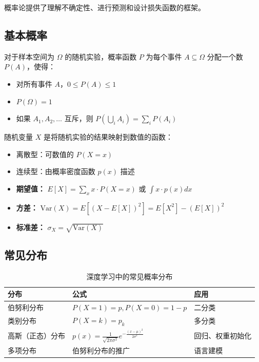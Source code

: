 概率论提供了理解不确定性、进行预测和设计损失函数的框架。

\subsection{基本概率}

\begin{定义}[概率]
对于样本空间为 $\Omega$ 的随机实验，概率函数 $P$ 为每个事件 $A \subseteq \Omega$ 分配一个数 $P(A)$，使得：
\begin{itemize}
    \item 对所有事件 $A$，$0 \leq P(A) \leq 1$
    \item $P(\Omega) = 1$
    \item 如果 $A_1, A_2, \ldots$ 互斥，则 $P(\bigcup_i A_i) = \sum_i P(A_i)$
\end{itemize}
\end{定义}

\begin{定义}[随机变量]
随机变量 $X$ 是将随机实验的结果映射到数值的函数：
\begin{itemize}
    \item 离散型：可数值的 $P(X = x)$
    \item 连续型：由概率密度函数 $p(x)$ 描述
\end{itemize}
\end{定义}

\begin{itemize}
    \item \textbf{期望值：} $E[X] = \sum_x x \cdot P(X=x)$ 或 $\int x \cdot p(x) dx$
    \item \textbf{方差：} $\text{Var}(X) = E[(X - E[X])^2] = E[X^2] - (E[X])^2$
    \item \textbf{标准差：} $\sigma_X = \sqrt{\text{Var}(X)}$
\end{itemize}

\subsection{常见分布}

\begin{table}[ht]
    \centering
    \caption{深度学习中的常见概率分布}
    \begin{tabular}{L{3cm} L{4cm} L{5cm}}
        \toprule
        \textbf{分布} & \textbf{公式} & \textbf{应用} \\
        \midrule
        伯努利分布 & $P(X=1) = p, P(X=0) = 1-p$ & 二分类 \\
        类别分布 & $P(X=k) = p_k$ & 多分类 \\
        高斯（正态）分布 & $p(x) = \frac{1}{\sqrt{2\pi\sigma^2}}e^{-\frac{(x-\mu)^2}{2\sigma^2}}$ & 回归、权重初始化 \\
        多项分布 & 伯努利分布的推广 & 语言建模 \\
        \bottomrule
    \end{tabular}
\end{table}

